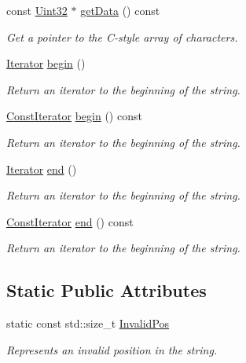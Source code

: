 \begin{DoxyCompactItemize}
const \hyperlink{namespacesf_aa746fb1ddef4410bddf198ebb27e727c}{Uint32} $\ast$ \hyperlink{classsf_1_1_string_af2d4e70869ebd38e225c6796e1325ae4}{get\-Data} () const 
\begin{DoxyCompactList}\small\item\em Get a pointer to the C-\/style array of characters. \end{DoxyCompactList}\item 
\hyperlink{classsf_1_1_string_ac90f2b7b28f703020f8d027e98806235}{Iterator} \hyperlink{classsf_1_1_string_a8ec30ddc08e3a6bd11c99aed782f6dfe}{begin} ()
\begin{DoxyCompactList}\small\item\em Return an iterator to the beginning of the string. \end{DoxyCompactList}\item 
\hyperlink{classsf_1_1_string_a8e18efc2e8464f6eb82818902d527efa}{Const\-Iterator} \hyperlink{classsf_1_1_string_a09bbf7704847ed35bf1c18aca6fba2a2}{begin} () const 
\begin{DoxyCompactList}\small\item\em Return an iterator to the beginning of the string. \end{DoxyCompactList}\item 
\hyperlink{classsf_1_1_string_ac90f2b7b28f703020f8d027e98806235}{Iterator} \hyperlink{classsf_1_1_string_ac823012f39cb6f61100418876e99d53b}{end} ()
\begin{DoxyCompactList}\small\item\em Return an iterator to the beginning of the string. \end{DoxyCompactList}\item 
\hyperlink{classsf_1_1_string_a8e18efc2e8464f6eb82818902d527efa}{Const\-Iterator} \hyperlink{classsf_1_1_string_ab6fb6ee1b21bd5dbdc9d6840f035eb79}{end} () const 
\begin{DoxyCompactList}\small\item\em Return an iterator to the beginning of the string. \end{DoxyCompactList}\end{DoxyCompactItemize}
\subsection*{Static Public Attributes}
\begin{DoxyCompactItemize}
\item 
static const std\-::size\-\_\-t \hyperlink{classsf_1_1_string_abaadecaf12a6b41c54d725c75fd28527}{Invalid\-Pos}
\begin{DoxyCompactList}\small\item\em Represents an invalid position in the string. \end{DoxyCompactList}\end{DoxyCompactItemize}
